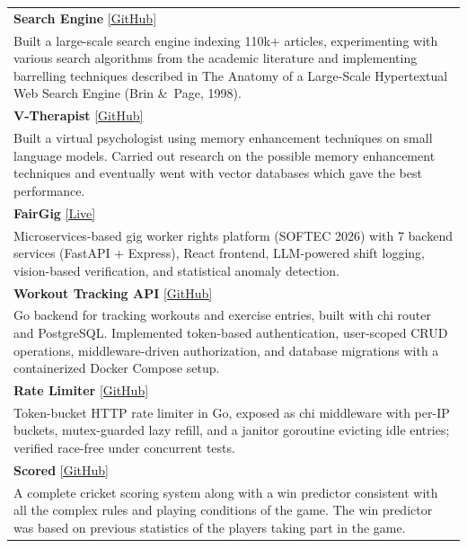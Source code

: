 \documentclass[a4paper,9pt]{extarticle}
\begin{document}
\begin{tabularx}{\linewidth}{ @{}X@{} }
\textbf{Search Engine} \hfill \href{https://github.com/saad1551/SearchEngine}{[GitHub]} \\
Built a large-scale search engine indexing 110k+ articles, experimenting with various search algorithms from the academic literature and implementing barrelling techniques described in The Anatomy of a Large-Scale Hypertextual Web Search Engine (Brin \&\ Page, 1998). \\[0pt]

\textbf{V-Therapist} \hfill \href{https://github.com/saad1551/psychologist-language-model}{[GitHub]} \\
Built a virtual psychologist using memory enhancement techniques on small language models. Carried out research on the possible memory enhancement techniques and eventually went with vector databases which gave the best performance. \\[0pt]

\textbf{FairGig} \hfill \href{https://fairgig.online}{[Live]} \\
Microservices-based gig worker rights platform (SOFTEC 2026) with 7 backend services (FastAPI + Express), React frontend, LLM-powered shift logging, vision-based verification, and statistical anomaly detection. \\[0pt]

\textbf{Workout Tracking API} \hfill \href{https://github.com/saad1551/workouts}{[GitHub]} \\
Go backend for tracking workouts and exercise entries, built with chi router and PostgreSQL. Implemented token-based authentication, user-scoped CRUD operations, middleware-driven authorization, and database migrations with a containerized Docker Compose setup. \\[0pt]

\textbf{Rate Limiter} \hfill \href{https://github.com/saad1551/rate-limiter}{[GitHub]} \\
Token-bucket HTTP rate limiter in Go, exposed as chi middleware with per-IP buckets, mutex-guarded lazy refill, and a janitor goroutine evicting idle entries; verified race-free under concurrent tests. \\[0pt]

\textbf{Scored} \hfill \href{https://github.com/saad1551/cricketScoreboard}{[GitHub]} \\
A complete cricket scoring system along with a win predictor consistent with all the complex rules and playing conditions of the game. The win predictor was based on previous statistics of the players taking part in the game.\\[0pt]


\end{tabularx}
\end{document}
